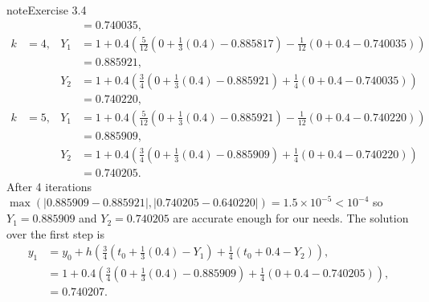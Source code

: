 \documentclass[letterpaper,10pt,english]{jupyterBook}
\begin{document}
\begin{sphinxadmonition}{note}{Exercise 3.4}
\begin{align*}
    && &= 0.740035, \\
    k &= 4, & Y_1 &= 1 + 0.4 (\tfrac{5}{12} (0 + \tfrac{1}{3} (0.4) - 0.885817) - \tfrac{1}{12} (0 + 0.4 - 0.740035)) \\
    && &= 0.885921, \\
    && Y_2 &= 1 + 0.4 (\tfrac{3}{4} (0 + \tfrac{1}{3} (0.4) - 0.885921) + \tfrac{1}{4} (0 + 0.4 - 0.740035)) \\
    && &= 0.740220, \\
    k &= 5, & Y_1 &= 1 + 0.4 (\tfrac{5}{12} (0 + \tfrac{1}{3} (0.4) - 0.885921) - \tfrac{1}{12} (0 + 0.4 - 0.740220)) \\
    && &= 0.885909, \\
    && Y_2 &= 1 + 0.4 (\tfrac{3}{4} (0 + \tfrac{1}{3} (0.4) - 0.885909) + \tfrac{1}{4} (0 + 0.4 - 0.740220)) \\
    && &= 0.740205.
\end{align*}
\sphinxAtStartPar
After 4 iterations \(\max(|0.885909 - 0.885921|, |0.740205 - 0.640220|) = 1.5\times 10^{-5} < 10^{-4}\) so \(Y_1 = 0.885909\) and \(Y_2 = 0.740205\) are accurate enough for our needs. The solution over the first step is
\begin{align*}
    y_1 &= y_0 + h (\tfrac{3}{4} (t_0 + \tfrac{1}{3}(0.4) - Y_1) + \tfrac{1}{4} (t_0 + 0.4 - Y_2)), \\
    &= 1 + 0.4 (\tfrac{3}{4} (0 + \frac{1}{3}(0.4) - 0.885909) + \frac{1}{4} (0 + 0.4 - 0.740205)), \\
    &= 0.740207.
\end{align*}\end{sphinxadmonition}
\end{document}
